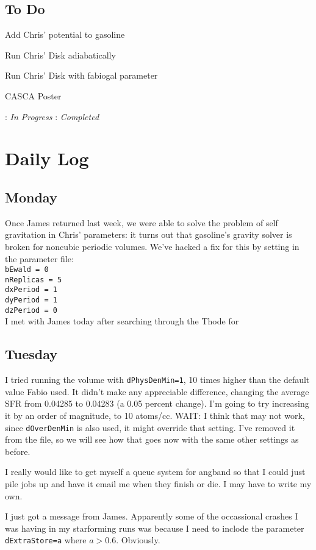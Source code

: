 \documentclass[11pt,letterpaper]{article}
\begin{document}
\pagebreak
\subsection*{To Do}
\begin{bullets}
\item[\checkmark] Add Chris' potential to gasoline
\item[\checkmark] Run Chris' Disk adiabatically
\item[\checkmark] Run Chris' Disk with fabiogal parameter
\item[\textleaf] CASCA Poster
\end{bullets}

\textleaf : \textit{In Progress} \qquad \checkmark : \textit{Completed}

\section*{Daily Log}
\subsection*{Monday}
Once James returned last week, we were able to solve the problem of self 
gravitation in Chris' parameters: it turns out that gasoline's gravity solver
is broken for noncubic periodic volumes.  We've hacked a fix for this by setting
in the parameter file:\\
\verb!bEwald = 0!\\
\verb!nReplicas = 5!\\
\verb!dxPeriod = 1!\\
\verb!dyPeriod = 1!\\
\verb!dzPeriod = 0!\\
I met with James today after searching through the Thode for 
\subsection*{Tuesday}
I tried running the volume with \verb!dPhysDenMin=1!, 10 times higher than the 
default value Fabio used.  It didn't make any appreciable difference, changing
the average SFR from 0.04285 to 0.04283 (a 0.05 percent change).  I'm going to
try increasing it by an order of magnitude, to 10 atoms/cc.  WAIT: I think
that may not work, since \verb!dOverDenMin! is also used, it might override that
setting.  I've removed it from the file, so we will see how that goes now with 
the same other settings as before.

I really would like to get myself a queue system for angband so that I could 
just pile jobs up and have it email me when they finish or die.  I may have to 
write my own.

I just got a message from James.  Apparently some of the occassional crashes I 
was having in my starforming runs was because I need to inclode the parameter
\verb!dExtraStore=a! where $a>0.6$. Obviously.
\end{document}
